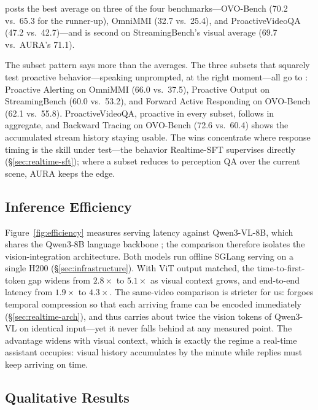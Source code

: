 \mossrealtime{} posts the best average on three of the four
benchmarks---OVO-Bench (70.2 vs.\ 65.3 for the runner-up), OmniMMI
(32.7 vs.\ 25.4), and ProactiveVideoQA (47.2 vs.\ 42.7)---and is
second on StreamingBench's visual average (69.7 vs.\ AURA's 71.1).

The subset pattern says more than the averages. The three subsets that
squarely test proactive behavior---speaking unprompted, at the right
moment---all go to \mossrealtime{}: Proactive Alerting on OmniMMI
(66.0 vs.\ 37.5), Proactive Output on StreamingBench (60.0 vs.\ 53.2),
and Forward Active Responding on OVO-Bench (62.1 vs.\ 55.8).
ProactiveVideoQA, proactive in every subset, follows in aggregate, and
Backward Tracing on OVO-Bench (72.6 vs.\ 60.4) shows the accumulated
stream history staying usable. The wins concentrate where response
timing is the skill under test---the behavior Realtime-SFT
supervises directly (\S\ref{sec:realtime-sft}); where a subset reduces
to perception QA over the current scene, AURA keeps the edge.

\subsection{Inference Efficiency}\label{sec:eval-efficiency}

Figure~\ref{fig:efficiency} measures serving latency against
Qwen3-VL-8B, which shares the Qwen3-8B language backbone
\citep{Yang2025qwen}; the comparison therefore isolates the
vision-integration architecture. Both models run offline SGLang
serving on a single H200 (\S\ref{sec:infrastructure}). With ViT output
matched, the time-to-first-token gap widens from $2.8\times$ to
$5.1\times$ as visual context grows, and end-to-end latency from
$1.9\times$ to $4.3\times$. The same-video comparison is stricter for
us: \mossvl{} forgoes temporal compression so that each arriving frame
can be encoded immediately (\S\ref{sec:realtime-arch}), and thus
carries about twice the vision tokens of Qwen3-VL on identical
input---yet it never falls behind at any measured point. The advantage widens
with visual context, which is exactly the regime a real-time assistant
occupies: visual history accumulates by the minute while replies must
keep arriving on time.

\subsection{Qualitative Results}\label{sec:eval-showcase}

